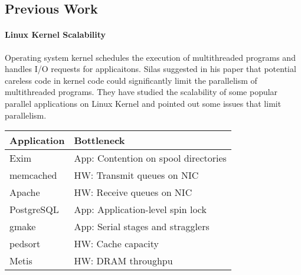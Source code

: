 \subsection{Previous Work}

\paragraph{Linux Kernel Scalability} Operating system kernel schedules the
execution of multithreaded programs and handles I/O requests for 
applicaitons. Silas\cite{rel:silas} suggested in his paper that potential
careless code in kernel code could significantly limit the parallelism of 
multithreaded programs. They have studied the scalability of some popular 
parallel applications on Linux Kernel and pointed out some issues that 
limit parallelism.
\begin{center}
\begin{tabular}[t] {l|l} 
Application & Bottleneck \\
\hline
Exim &App: Contention on spool directories \\
memcached &HW: Transmit queues on NIC \\
Apache &HW: Receive queues on NIC \\
PostgreSQL &App: Application-level spin lock \\
gmake &App: Serial stages and stragglers \\
pedsort &HW: Cache capacity \\
Metis &HW: DRAM throughpu 
\end{tabular}
\end{center}

%
